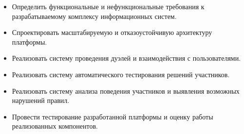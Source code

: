 
\begin{itemize}
\item Определить функциональные и нефункциональные требования к разрабатываемому комплексу информационных систем.
\item Спроектировать масштабируемую и отказоустойчивую архитектуру платформы.
\item Реализовать систему проведения дуэлей и взаимодействия с пользователями.
\item Реализовать систему автоматического тестирования решений участников.
\item Реализовать систему анализа поведения участников и выявления возможных нарушений правил.
\item Провести тестирование разработанной платформы и оценку работы реализованных компонентов.
\end{itemize}
